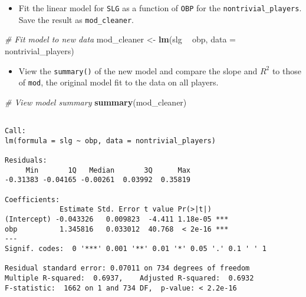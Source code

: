 \documentclass[
]{book}
\newenvironment{Shaded}{\begin{snugshade}}{\end{snugshade}}
\newcommand{\CommentTok}[1]{\textcolor[rgb]{0.56,0.35,0.01}{\textit{#1}}}
\newcommand{\DataTypeTok}[1]{\textcolor[rgb]{0.13,0.29,0.53}{#1}}
\newcommand{\KeywordTok}[1]{\textcolor[rgb]{0.13,0.29,0.53}{\textbf{#1}}}
\newcommand{\NormalTok}[1]{#1}
\newcommand{\OperatorTok}[1]{\textcolor[rgb]{0.81,0.36,0.00}{\textbf{#1}}}
\newcommand{\StringTok}[1]{\textcolor[rgb]{0.31,0.60,0.02}{#1}}
\providecommand{\tightlist}{%
  \setlength{\itemsep}{0pt}\setlength{\parskip}{0pt}}
\begin{document}
\begin{itemize}
\tightlist
\item
  Fit the linear model for \texttt{SLG} as a function of \texttt{OBP} for the \texttt{nontrivial\_players}. Save the result as \texttt{mod\_cleaner}.
\end{itemize}

\begin{Shaded}
\begin{Highlighting}[]
\CommentTok{# Fit model to new data}
\NormalTok{mod_cleaner <-}\StringTok{ }\KeywordTok{lm}\NormalTok{(slg }\OperatorTok{~}\StringTok{ }\NormalTok{obp, }\DataTypeTok{data =}\NormalTok{ nontrivial_players)}
\end{Highlighting}
\end{Shaded}

\begin{itemize}
\tightlist
\item
  View the \texttt{summary()} of the new model and compare the slope and \(R^2\) to those of \texttt{mod}, the original model fit to the data on all players.
\end{itemize}

\begin{Shaded}
\begin{Highlighting}[]
\CommentTok{# View model summary}
\KeywordTok{summary}\NormalTok{(mod_cleaner)}
\end{Highlighting}
\end{Shaded}

\begin{verbatim}

Call:
lm(formula = slg ~ obp, data = nontrivial_players)

Residuals:
     Min       1Q   Median       3Q      Max 
-0.31383 -0.04165 -0.00261  0.03992  0.35819 

Coefficients:
             Estimate Std. Error t value Pr(>|t|)    
(Intercept) -0.043326   0.009823  -4.411 1.18e-05 ***
obp          1.345816   0.033012  40.768  < 2e-16 ***
---
Signif. codes:  0 '***' 0.001 '**' 0.01 '*' 0.05 '.' 0.1 ' ' 1

Residual standard error: 0.07011 on 734 degrees of freedom
Multiple R-squared:  0.6937,    Adjusted R-squared:  0.6932 
F-statistic:  1662 on 1 and 734 DF,  p-value: < 2.2e-16
\end{verbatim}

\begin{Shaded}
\end{Shaded}
\end{document}
